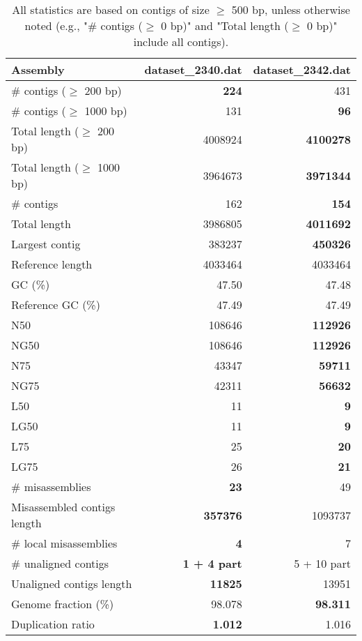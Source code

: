 \documentclass[12pt,a4paper]{article}
\begin{document}
\begin{table}[ht]
\begin{center}
\caption{All statistics are based on contigs of size $\geq$ 500 bp, unless otherwise noted (e.g., "\# contigs ($\geq$ 0 bp)" and "Total length ($\geq$ 0 bp)" include all contigs).}
\begin{tabular}{|l*{2}{|r}|}
\hline
Assembly & dataset\_2340.dat & dataset\_2342.dat \\ \hline
\# contigs ($\geq$ 200 bp) & {\bf 224} & 431 \\ \hline
\# contigs ($\geq$ 1000 bp) & 131 & {\bf 96} \\ \hline
Total length ($\geq$ 200 bp) & 4008924 & {\bf 4100278} \\ \hline
Total length ($\geq$ 1000 bp) & 3964673 & {\bf 3971344} \\ \hline
\# contigs & 162 & {\bf 154} \\ \hline
Total length & 3986805 & {\bf 4011692} \\ \hline
Largest contig & 383237 & {\bf 450326} \\ \hline
Reference length & 4033464 & 4033464 \\ \hline
GC (\%) & 47.50 & 47.48 \\ \hline
Reference GC (\%) & 47.49 & 47.49 \\ \hline
N50 & 108646 & {\bf 112926} \\ \hline
NG50 & 108646 & {\bf 112926} \\ \hline
N75 & 43347 & {\bf 59711} \\ \hline
NG75 & 42311 & {\bf 56632} \\ \hline
L50 & 11 & {\bf 9} \\ \hline
LG50 & 11 & {\bf 9} \\ \hline
L75 & 25 & {\bf 20} \\ \hline
LG75 & 26 & {\bf 21} \\ \hline
\# misassemblies & {\bf 23} & 49 \\ \hline
Misassembled contigs length & {\bf 357376} & 1093737 \\ \hline
\# local misassemblies & {\bf 4} & 7 \\ \hline
\# unaligned contigs & {\bf 1 + 4 part} & 5 + 10 part \\ \hline
Unaligned contigs length & {\bf 11825} & 13951 \\ \hline
Genome fraction (\%) & 98.078 & {\bf 98.311} \\ \hline
Duplication ratio & {\bf 1.012} & 1.016 \\ \hline

\end{tabular}
\end{center}
\end{table}
\end{document}
